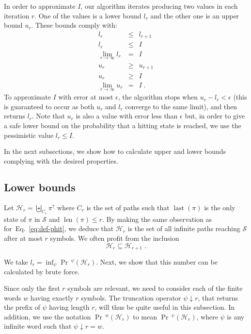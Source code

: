 \documentclass[final,3p,times,twocolumn]{elsarticle}
\theoremstyle{plain}
\theoremstyle{definition}
\newcommand{\reachset}{\mathcal{S}}
\newcommand{\errthres}{\epsilon}
\newcommand{\fpath}{\pi}
\newcommand{\extension}[1]{{#1}^{\uparrow}}
\newcommand{\fword}{w}
\DeclareMathOperator{\lastWord}{last}
\newcommand{\last}[1]{\lastWord({#1})}
\newcommand{\infimum}{I}
\newcommand{\phit}{\mathcal{H}}
\DeclareMathOperator{\lenWord}{len}
\newcommand{\len}[1]{\lenWord({#1})}
\newcommand{\iword}{\psi}
\DeclareMathOperator{\prWord}{Pr}
\newcommand{\lb}{l}
\newcommand{\ub}{u}
\newcommand{\iter}{r}
\newcommand{\recallEquation}[1]{Eq.~\ref{#1}}
\newcommand{\wprefix}[2]{\text{${#1}\!\!\downarrow\!\!{#2}$}}
\newcommand{\pr}{\prWord\,\!}
\begin{document}
In order to approximate $\infimum$, our algorithm iterates producing two
values in each iteration $r$. One of the values is a lower bound $\lb_{\iter}$
and the other one is an upper bound $\ub_{\iter}$. These bounds comply with:
\begin{eqnarray}
\lb_{\iter} & \leq & \lb_{\iter+1} \label{ineq:lb-increase} \\
\lb_{\iter} & \leq & \infimum \label{ineq:lb-islower} \\
\lim_{\iter \to \infty} \lb_{\iter} & = & \infimum \label{eq:lb-tends-inf} \\
\ub_{\iter} & \geq & \ub_{\iter+1} \label{ineq:ub-decrease} \\
\ub_{\iter} & \geq & \infimum \label{ineq:ub-isupper}  \\
\lim_{\iter \to \infty} \ub_{\iter} & = & \infimum \label{eq:ub-tends-inf} \; . 
\end{eqnarray}
To approximate $\infimum$ with error at most $\errthres$, the algorithm stops
when $\ub_{\iter} - \lb_{\iter} < \errthres$ (this is guaranteed to occur as
both $\ub_{\iter}$ and $\lb_{\iter}$ converge to the
same limit), and then returns $\lb_{\iter}$. Note that $\ub_{\iter}$ is also a
value with error less than $\errthres$ but, in order to give a safe lower bound
on the probability that a hitting state is reached, we use the pessimistic
value $\lb_{\iter} \leq \infimum$.

In the next subsections, we show how to calculate upper and lower bounds
complying with the desired properties.

\subsection{Lower bounds}

Let $\phit_{\iter} = \biguplus_{C_{\iter}} \extension{\fpath}$ where
$C_{\iter}$ is the set of paths such that $\last{\fpath}$ is the only state
of $\fpath$ in $\reachset$ and $\len{\fpath} \leq \iter$. By making the
same observation as for~\recallEquation{eq:def-phit}, we deduce that
$\phit_{\iter}$ is the set of all infinite paths reaching $\reachset$
after at most $\iter$ symbols. We often profit from the inclusion
\[ \phit_{\iter} \subseteq \phit_{\iter+1} \; . \]

We take $\lb_{\iter} = \inf_{\iword} \pr^{\iword}(\phit_{\iter})$.
Next, we show that this number can be calculated by brute force. 

Since only the first $\iter$ symbols are relevant, we need to consider each of
the finite words $\fword$ having exactly $\iter$ symbols. The truncation
operator $\wprefix{\iword}{\iter}$, that returns the prefix of $\iword$
having length $\iter$, will thus be quite useful in this subsection.
In addition, we use the notation $\pr^{\fword}(\phit_{\iter})$ to mean
$\pr^{\iword}(\phit_{\iter})$, where $\iword$ is any infinite word such
that $\wprefix{\iword}{\iter} = \fword$.
\end{document}
